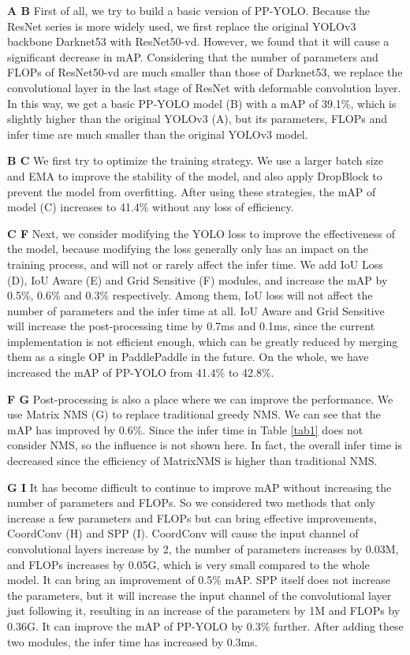 \documentclass[10pt,twocolumn,letterpaper]{article}
\newcommand{\pheadB}[1] {\vspace{1mm}\noindent\textbf{#1}}
\begin{document}
	\pheadB{A  B} 
	First of all, we try to build a basic version of PP-YOLO. Because the ResNet\cite{resnet} series is more widely used, we first replace the original YOLOv3 backbone Darknet53 with ResNet50-vd. However, we found that it will cause a significant decrease in mAP. Considering that the number of parameters and FLOPs of ResNet50-vd are much smaller than those of Darknet53, we replace the  convolutional layer in the last stage of ResNet with deformable convolution layer\cite{dcn}. In this way, we get a basic PP-YOLO model (B) with a mAP of 39.1\%, which is slightly higher than the original YOLOv3 (A), but its parameters, FLOPs and infer time are much smaller than the original YOLOv3 model.
	
	\pheadB{B  C} 
	We first try to optimize the training strategy. We use a larger batch size and EMA to improve the stability of the model, and also apply DropBlock to prevent the model from overfitting. After using these strategies, the mAP of model (C) increases to 41.4\% without any loss of efficiency.
	
	\pheadB{C  F} 
	Next, we consider modifying the YOLO loss to improve the effectiveness of the model, because modifying the loss generally only has an impact on the training process, and will not or rarely affect the infer time.
	We add IoU Loss (D), IoU Aware (E) and Grid Sensitive (F) modules, and increase the mAP by 0.5\%, 0.6\% and 0.3\% respectively. Among them, IoU loss will not affect the number of parameters and the infer time at all. IoU Aware and Grid Sensitive will increase the post-processing time by 0.7ms and 0.1ms, since the current implementation is not efficient enough, which can be greatly reduced by merging them as a single OP in PaddlePaddle in the future. On the whole, we have increased the mAP of PP-YOLO from 41.4\% to 42.8\%.
	
	\pheadB{F  G} 
	Post-processing is also a place where we can improve the performance. We use Matrix NMS (G) to replace traditional greedy NMS. We can see that the mAP has improved by 0.6\%. Since the infer time in Table \ref{tab1} does not consider NMS, so the influence is not shown here. In fact, the overall infer time is decreased since the efficiency of MatrixNMS is higher than traditional NMS.
	
	\pheadB{G  I} 
	It has become difficult to continue to improve mAP without increasing the number of parameters and FLOPs. So we considered two methods that only increase a few parameters and FLOPs but can bring effective improvements, CoordConv (H) and SPP (I).
	CoordConv will cause the input channel of convolutional layers increase by 2, the number of parameters increases by 0.03M, and FLOPs increases by 0.05G, which is very small compared to the whole model. It can bring an improvement of 0.5\% mAP. 
	SPP itself does not increase the parameters, but it will increase the input channel of the convolutional layer just following it, resulting in an increase of the parameters by 1M and FLOPs by 0.36G. It can improve the mAP of PP-YOLO by 0.3\% further. After adding these two modules, the infer time has increased by 0.3ms.
	
\end{document}
